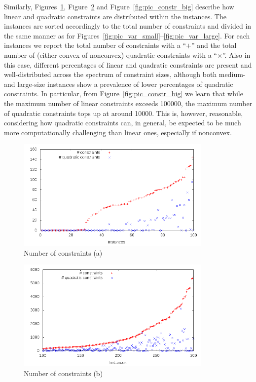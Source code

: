 Similarly, Figures~\ref{fig:pic_constr_small}, Figure~\ref{fig:pic_constr_medium}
and Figure~\ref{fig:pic_constr_big} describe how linear and quadratic
constraints are distributed within the instances. The instances are sorted
accordingly to the total number of constraints and divided in the
same manner as for Figures~\ref{fig:pic_var_small}--\ref{fig:pic_var_large}.
For each instances we report the total number of constraints with a ``$+$''
and the total number of (either convex of nonconvex) quadratic constraints
with a ``$\times$''. Also in this case, different percentages of linear and
quadratic constraints are present and well-distributed across the spectrum
of constraint sizes, although both medium- and large-size instances show a
prevalence of lower percentages of quadratic constraints. In particular,
from Figure~\ref{fig:pic_constr_big} we learn that while the maximum number
of linear constraints exceeds 100000, the maximum number of quadratic
constraints tops up at around 10000. This is, however, reasonable, considering
how quadratic constraints can, in general, be expected to be much more
computationally challenging than linear ones, especially if nonconvex.

\begin{figure}\centering
  \includegraphics[width=0.85\textwidth]{pic_constr_small.png}
  \caption{Number of constraints (a) \label{fig:pic_constr_small}}
\end{figure}

\begin{figure}\centering
  \includegraphics[width=0.85\textwidth]{pic_constr_medium.png}
  \caption{Number of constraints (b) \label{fig:pic_constr_medium}}
\end{figure}

